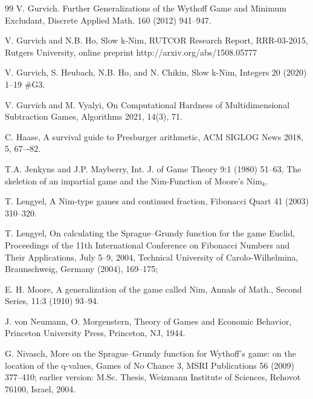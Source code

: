 \documentclass{article}
\theoremstyle{definition}
\begin{document}
\begin{thebibliography}{99}
V. Gurvich.
Further Generalizations of the Wythoff Game and Minimum Excludant,
Discrete Applied Math. 160 (2012) 941--947.

V. Gurvich and N.B. Ho, Slow k-Nim, 
RUTCOR Research Report, RRR-03-2015, Rutgers University, 
online preprint  
http://arxiv.org/abs/1508.05777 

V. Gurvich, S. Heubach, N.B. Ho, and N. Chikin, 
Slow k-Nim, Integers 20 (2020) 1--19  \#G3.

V. Gurvich and M.  Vyalyi,  On Computational Hardness of
Multidimensional Subtraction Games, Algorithms 2021, 14(3), 71.

C. Haase, A survival guide to Presburger arithmetic, ACM SIGLOG News 2018, 5, 67–-82.

T.A. Jenkyns and J.P. Mayberry,
Int. J. of Game Theory 9:1 (1980) 51--63,
The skeletion of an impartial game
and the Nim-Function of Moore's Nim$_k$.

T. Lengyel, 
A Nim-type games and continued fraction, 
Fibonacci Quart 41 (2003) 310--320.

T. Lengyel, On calculating the Sprague–Grundy function for the game Euclid, 
Proceedings of the 11th International Conference on Fibonacci
Numbers and Their Applications, 
July 5–9, 2004, Technical University of Carolo-Wilhelmina, 
Braunschweig, Germany (2004), 169--175; 


E. H. Moore, A generalization of the game called Nim, 
Annals of Math., Second Series, 11:3 (1910) 93--94.

J. von Neumann, O. Morgenstern, 
Theory of Games and Economic Behavior, 
Princeton University Press, Princeton, NJ, 1944.

G. Nivasch, 
More on the Sprague–Grundy function for
Wythoff’s game: on the location of the q-values, 
Games of No Chance 3, 
MSRI Publications 56 (2009) 377--410; 
earlier version: 
M.Sc. Thesis, Weizmann Institute of Sciences, 
Rehovot 76100, Israel, 2004.


\end{thebibliography}
\end{document}
